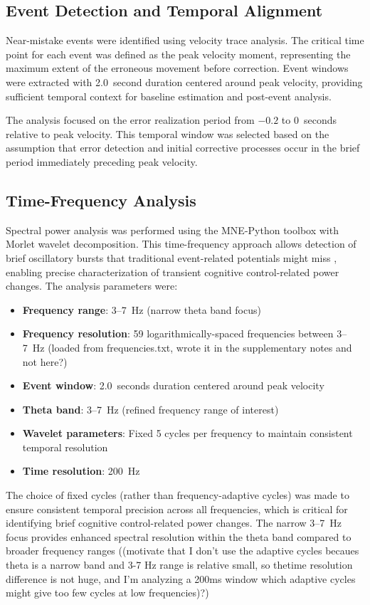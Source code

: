 \documentclass[11pt]{article}
\begin{document}
\subsection{Event Detection and Temporal Alignment}

Near-mistake events were identified using velocity trace analysis. The critical time point for each event was defined as the peak velocity moment, representing the maximum extent of the erroneous movement before correction. Event windows were extracted with 2.0~second duration centered around peak velocity, providing sufficient temporal context for baseline estimation and post-event analysis.

The analysis focused on the error realization period from $-0.2$ to $0$~seconds relative to peak velocity. This temporal window was selected based on the assumption that error detection and initial corrective processes occur in the brief period immediately preceding peak velocity.

\subsection{Time-Frequency Analysis}

Spectral power analysis was performed using the MNE-Python toolbox with Morlet wavelet decomposition. This time-frequency approach allows detection of brief oscillatory bursts that traditional event-related potentials might miss \citep{makeig2004mining}, enabling precise characterization of transient cognitive control-related power changes. The analysis parameters were:

\begin{itemize}
\item \textbf{Frequency range}: 3--7~Hz (narrow theta band focus)
\item \textbf{Frequency resolution}: 59 logarithmically-spaced frequencies between 3--7~Hz (loaded from frequencies.txt, wrote it in the supplementary notes and not here?)
\item \textbf{Event window}: 2.0~seconds duration centered around peak velocity
\item \textbf{Theta band}: 3--7~Hz (refined frequency range of interest)
\item \textbf{Wavelet parameters}: Fixed 5 cycles per frequency to maintain consistent temporal resolution 
\item \textbf{Time resolution}: 200~Hz 
\end{itemize}

The choice of fixed cycles (rather than frequency-adaptive cycles) was made to ensure consistent temporal precision across all frequencies, which is critical for identifying brief cognitive control-related power changes. The narrow 3--7~Hz focus provides enhanced spectral resolution within the theta band compared to broader frequency ranges ((motivate that I don't use the adaptive cycles becaues theta is a narrow band and 3-7 Hz range is relative small, so thetime resolution difference is not huge, and I'm analyzing a 200ms window which adaptive cycles might give too few cycles at low frequencies)?)
\end{document}
